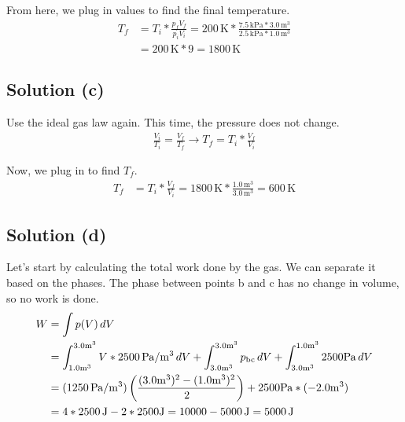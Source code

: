 \documentclass[12pt]{article}
\begin{document}
            From here, we plug in values to find the final temperature.
            \begin{align}
                T_f &=  T_i * \frac{p_f V_f}{p_i V_i}
                    =   200\,\unit{\kelvin} * \frac{7.5\,\unit{\kilo\pascal} * 3.0\,\unit{\meter^3}}{2.5\,\unit{\kilo\pascal} * 1.0\,\unit{\meter^3}}\\
                    &=  200\,\unit{\kelvin} * 9
                    =   \boxed{1800\,\unit{\kelvin}}
            \end{align}

        \subsection{Solution (c)}
            Use the ideal gas law again.
            This time, the pressure does not change.
            \begin{gather}
                \frac{V_i}{T_i} =   \frac{V_f}{T_f} \to
                    T_f =   T_i * \frac{V_f}{V_i}
            \end{gather}

            Now, we plug in to find $T_f$.
            \begin{align}
                T_f &=  T_i * \frac{V_f}{V_i}
                    =   1800\,\unit{\kelvin} * \frac{1.0\,\unit{\meter^3}}{3.0\,\unit{\meter^3}}
                    =   \boxed{600\,\unit{\kelvin}}
            \end{align}

        \subsection{Solution (d)}
            Let's start by calculating the total work done by the gas.
            We can separate it based on the phases.
            The phase between points b and c has no change in volume, so no work is done.
            \begin{align}
                W   &=  \int p(V)\,dV\\
                    &=  \int_{1.0 \unit{\meter^3}}^{3.0 \unit{\meter^3}} V * 2500\,\unit{\pascal/\meter^3}\,dV
                        +   \int_{3.0 \unit{\meter^3}}^{3.0 \unit{\meter^3}} p_{\rm bc}\,dV
                        +   \int_{3.0 \unit{\meter^3}}^{1.0 \unit{\meter^3}} 2500 \unit{\pascal}\,dV\\
                    &=  (1250\,\unit{\pascal/\meter^3}) \left( \frac{(3.0 \unit{\meter^3})^2 - (1.0 \unit{\meter^3})^2}{2} \right)
                        +   2500 \unit{\pascal} * (-2.0 \unit{\meter^3})\\
                    &=  4 * 2500\,\unit{\joule} - 2 * 2500 \unit{\joule}
                    =   10000 - 5000\,\unit{\joule}
                    =   5000\,\unit{\joule}
            \end{align}
\end{document}
